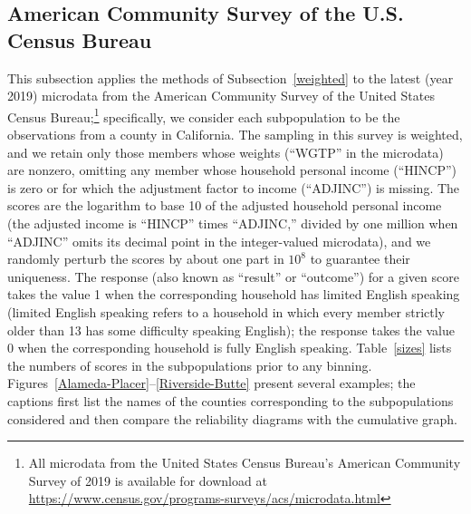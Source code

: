 \documentclass{article}
\begin{document}
\subsection{American Community Survey of the U.S. Census Bureau}
\label{census}

This subsection applies the methods of Subsection~\ref{weighted}
to the latest (year 2019) microdata from the American Community Survey
of the United States Census Bureau;\footnote{All microdata
from the United States Census Bureau's American Community Survey of 2019
is available for download at
\url{https://www.census.gov/programs-surveys/acs/microdata.html}}
specifically, we consider each subpopulation to be the observations
from a county in California. The sampling in this survey is weighted,
and we retain only those members whose weights (``WGTP'' in the microdata)
are nonzero, omitting any member whose household personal income
(``HINCP'') is zero or for which the adjustment factor to income (``ADJINC'')
is missing. The scores are the logarithm to base 10
of the adjusted household personal income
(the adjusted income is ``HINCP'' times ``ADJINC,'' divided by one million
when ``ADJINC'' omits its decimal point in the integer-valued microdata),
and we randomly perturb the scores by about one part in $10^8$ to guarantee
their uniqueness.
The response (also known as ``result'' or ``outcome'') for a given score
takes the value 1 when the corresponding household has limited English speaking
(limited English speaking refers to a household in which every member
strictly older than 13 has some difficulty speaking English);
the response takes the value 0
when the corresponding household is fully English speaking.
Table~\ref{sizes} lists the numbers of scores in the subpopulations
prior to any binning.
Figures~\ref{Alameda-Placer}--\ref{Riverside-Butte} present several examples;
the captions first list the names of the counties corresponding
to the subpopulations considered and then compare the reliability diagrams
with the cumulative graph.
\end{document}
